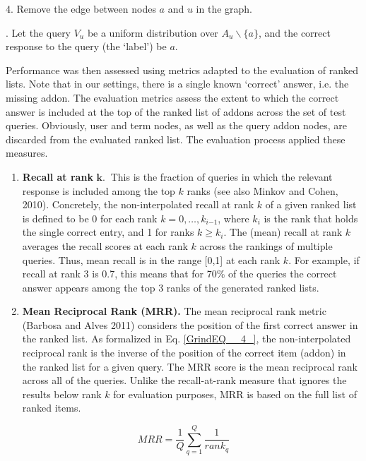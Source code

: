\documentclass{article} %
\begin{document}
4.  Remove the edge between nodes $a$ and $u$ in the graph. 

.  Let the query $V_u$ be a uniform distribution over $A_u\backslash \{a\}$, and the correct response to the query (the `label') be $a$.  

 

Performance was then assessed using metrics adapted to the evaluation of ranked lists. Note that in our settings, there is a single known `correct' answer, i.e. the missing addon. The evaluation metrics assess the extent to which the correct answer is included at the top of the ranked list of addons across the set of test queries. Obviously, user and term nodes, as well as the query addon nodes, are discarded from the evaluated ranked list. The evaluation process applied these measures.



\begin{enumerate}
\item  \textbf{Recall at rank }$\boldsymbol{k}\boldsymbol{.\ }$ This is the fraction of queries in which the relevant response is included among the top $k$ ranks (see also Minkov and Cohen, 2010). Concretely, the non-interpolated recall at rank $k$ of a given ranked list is defined to be 0 for each rank $k\mathrm{=0,}\mathrm{\dots },k_{i\mathrm{-}\mathrm{1}}$, where $k_i$ is the rank that holds the single correct entry, and 1 for ranks $k\mathrm{\ge }k_i$. The (mean) recall at rank $k$ averages the recall scores at each rank $k$ across the rankings of multiple queries. Thus, mean recall is in the range [0,1] at each rank $k$. For example, if recall at rank 3 is 0.7, this means that for 70\% of the queries the correct answer appears among the top 3 ranks of the generated ranked lists.

\item  \textbf{Mean Reciprocal Rank (MRR). }The mean reciprocal rank metric (Barbosa and Alves 2011) considers the position of the first correct answer in the ranked list. As formalized in Eq. \eqref{GrindEQ__4_}, the non-interpolated reciprocal rank is the inverse of the position of the correct item (addon) in the ranked list for a given query. The MRR score is the mean reciprocal rank across all of the queries. Unlike the recall-at-rank measure that ignores the results below rank $k$ for evaluation purposes, MRR is based on the full list of ranked items. 
\end{enumerate}

\noindent 
\begin{equation} \label{GrindEQ__4_} 
MRR\mathrm{=}\frac{\mathrm{1}}{Q}\sum^Q_{q\mathrm{=1}}{}\frac{\mathrm{1}}{rank_q} 
\end{equation} 
\end{document}
